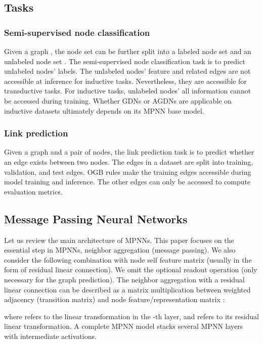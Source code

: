 \documentclass{article}
\begin{document}
\subsection{Tasks}
\subsubsection{Semi-supervised node classification}
Given a graph , the node set can be further split into a labeled node set  and an unlabeled node set . The semi-supervised node classification task is to predict unlabeled nodes' labels. The unlabeled nodes' feature and related edges are not accessible at inference for inductive tasks. Nevertheless, they are accessible for transductive tasks. For inductive tasks, unlabeled nodes' all information cannot be accessed during training. Whether GDNs or AGDNs are applicable on inductive datasets ultimately depends on its MPNN base model.

\subsubsection{Link prediction}
Given a graph  and a pair of nodes, the link prediction task is to predict whether an edge exists between two nodes. The edges in a dataset are split into training, validation, and test edges. OGB rules make the training edges accessible during model training and inference. The other edges can only be accessed to compute evaluation metrics.

\subsection{Message Passing Neural Networks}
Let us review the main architecture of MPNNs. This paper focuses on the essential step in MPNNs, neighbor aggregation (message passing). We also consider the following combination with node self feature matrix (usually in the form of residual linear connection). We omit the optional readout operation (only necessary for the graph prediction). 
The neighbor aggregation with a residual linear connection can be described as a matrix multiplication between weighted adjacency  (transition matrix) and node feature/representation matrix :

where  refers to the linear transformation in the -th layer, and  refers to its residual linear transformation. A complete MPNN model stacks several MPNN layers with intermediate activations.
\end{document}
